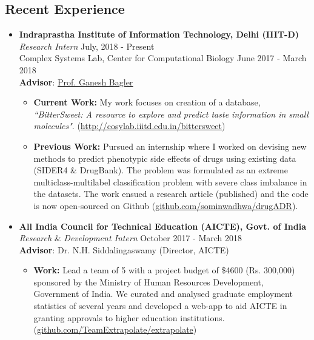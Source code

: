 \documentclass[margin,line]{res}
\begin{document}
\begin{resume}
\section{\sc Recent Experience}
\begin{itemize}[leftmargin=*]
\item {\bf Indraprastha Institute of Information Technology, Delhi (IIIT-D)}\\
\textit{Research Intern} \hfill July, 2018 - Present\\
Complex Systems Lab, Center for Computational Biology \hfill June 2017 - March 2018 \\  
{\bf Advisor}: {\href{https://scholar.google.co.in/citations?user=qyth_0QAAAAJ&hl=en}{\underline{Prof. Ganesh Bagler}}}
\begin{itemize}[leftmargin=*]
\item {\bf Current Work:} My work focuses on creation of a database, \textit{``BitterSweet: A resource to explore and predict taste information in small molecules"}. ({\href{http://cosylab.iiitd.edu.in/bittersweet/}{http://cosylab.iiitd.edu.in/bittersweet}})
\item {\bf Previous Work:} Pursued an internship where I worked on devising new methods to predict phenotypic side effects of drugs using existing data (SIDER4 \& DrugBank). The problem was formulated as an extreme multiclass-multilabel classification problem with severe class imbalance in the datasets. The work ensued a research article (published) and the code is now open-sourced on Github ({\href{https://github.com/sominwadhwa/drugADR}{\underline{github.com/sominwadhwa/drugADR}}}).
\end{itemize}
\item {\bf All India Council for Technical Education (AICTE), Govt. of India}\\
\textit{Research} \& \textit{Development Intern} \hfill October 2017 - March 2018\\  
{\bf Advisor}: Dr. N.H. Siddalingaswamy (Director, AICTE)
\begin{itemize}[leftmargin=*]
\item {\bf Work:} Lead a team of 5 with a project budget of \$4600 (Rs. 300,000) sponsored by the Ministry of Human Resources Development, Government of India. We curated and analysed graduate employment statistics of several years and developed a web-app to aid AICTE in granting approvals to higher education institutions. ({\href{https://github.com/TeamExtrapolate/extrapolate}{github.com/TeamExtrapolate/extrapolate}})
\end{itemize}
\end{itemize}


\end{resume}
\end{document}
